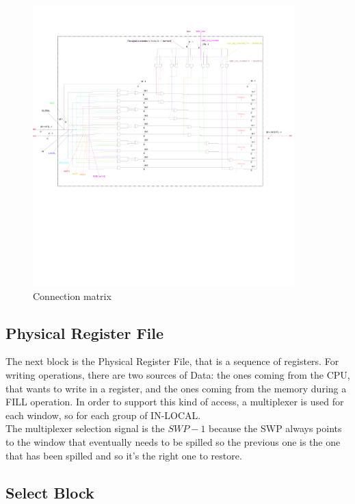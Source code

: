\begin{figure}[H]
  \centering
  \includegraphics[width=0.9\textwidth]{chapters/4_DecodeStage/images/connection_matrix.pdf}
  \caption{Connection matrix}
  \label{connection_matrix}
\end{figure}

\subsection{Physical Register File}

The next block is the Physical Register File, that is a sequence of registers. For writing operations, there are two sources of Data: the ones coming from the CPU, that wants to write in a register, and the ones coming from the memory during a FILL operation. In order to support this kind of access, a multiplexer is used for each window, so for each group of IN-LOCAL.\\

The multiplexer selection signal is the $SWP-1$ because the SWP always points to the window that eventually needs to be spilled so the previous one is the one that has been spilled and so it's the right one to restore.

\subsection{Select Block}

